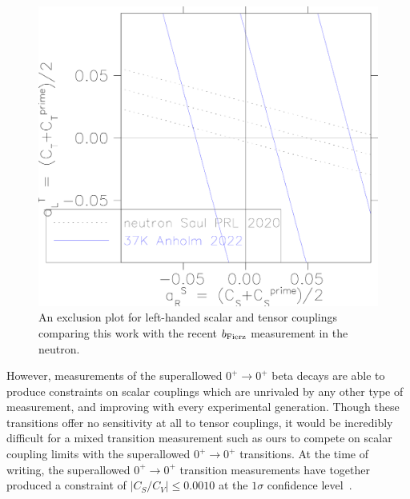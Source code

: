 \note{}
\begin{figure}[h!t!b!]
	\centering
	\includegraphics[width=.999\linewidth]{Figures/JB_exclusion.pdf}
	\caption[An exclusion plot for left-handed scalar and tensor couplings comparing this work with the recent $\bFierz$ measurement in the neutron]{An exclusion plot for left-handed scalar and tensor couplings comparing this work with the recent $\bFierz$ measurement in the neutron\cite{Saul2020}.}
	\label{fig:exclusionplotfromjohn}
\end{figure}

However, measurements of the superallowed $0^+ \rightarrow 0^+$ beta decays are able to produce constraints on scalar couplings which are unrivaled by any other type of measurement, and improving with every experimental generation.  Though these transitions offer no sensitivity at all to tensor couplings, it would be incredibly difficult for a mixed transition measurement such as ours to compete on scalar coupling limits with the superallowed $0^+ \rightarrow 0^+$ transitions.  At the time of writing, the superallowed $0^+ \rightarrow 0^+$ transition measurements have together produced a constraint of \mbox{$\left| C_S / C_V \right| \leq 0.0010$} at the $1\sigma$ confidence level~\cite{HardyTownerSuperallowed2020}.
\note{}


